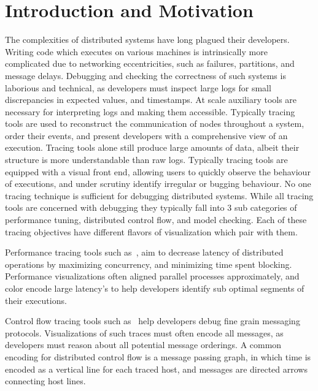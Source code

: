 \section{Introduction and Motivation}
\label{sec:intro}


The complexities of distributed systems have long plagued
their developers. Writing code which executes on various machines is
intrinsically more complicated due to networking eccentricities, such as
failures, partitions, and message delays. Debugging and checking the
correctness of such systems is laborious and technical, as developers
must inspect large logs for small discrepancies in expected values, and
timestamps. At scale auxiliary tools are necessary for interpreting logs
and making them accessible. Typically tracing tools are used to
reconstruct the communication of nodes throughout a system, order their
events, and present developers with a comprehensive view of an
execution.
    Tracing tools alone still produce large amounts of data, albeit
their structure is more understandable than raw logs. Typically tracing
tools are equipped with a visual front end, allowing users to quickly
observe the behaviour of executions, and under scrutiny identify
irregular or bugging behaviour. No one tracing technique is sufficient
for debugging distributed systems. While all tracing tools are
concerned with debugging they typically fall into 3 sub categories of
performance tuning, distributed control flow, and model checking. Each
of these tracing objectives have different flavors of visualization
which pair with them.

Performance tracing tools such
as~\cite{tensorflow2015-whitepaper,36356,202574,Nagel96vampir:visualization,Zaki:1999:TSP:1080598.1080606},
aim to decrease latency of distributed operations by maximizing
concurrency, and minimizing time spent blocking. Performance
visualizations often aligned parallel processes approximately, and color
encode large latency's to help developers identify sub optimal
segments of their executions.

Control flow tracing tools such
as~\cite{DBLP:conf:icse:2016c,AbrahamsonBBE2014,5071901} help
developers debug fine grain messaging protocols. Visualizations of
such traces must often encode all messages, as developers must reason
about all potential message orderings. A common encoding for
distributed control flow is a message passing graph, in which time is
encoded as a vertical line for each traced host, and messages are
directed arrows connecting host lines.

